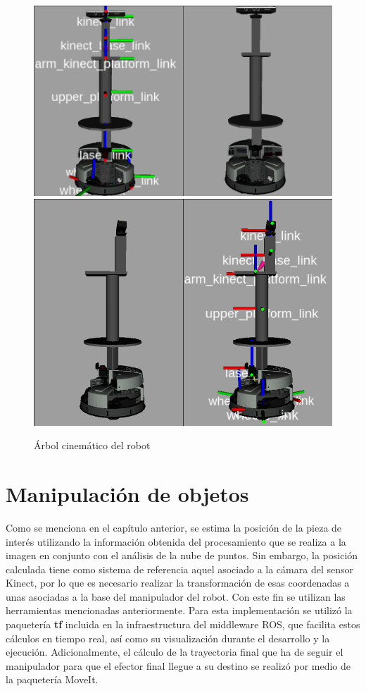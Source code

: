 \begin{figure}[ht]
    \centering
    \includegraphics[scale=0.3]{Figures/Robotino_model_front.png}
    \includegraphics[scale=0.3]{Figures/Robotino_model_side.png} 
        \caption{Árbol cinemático del robot}
        \label{fig:Robotino_models}
\end{figure}

\section{Manipulación de objetos}

Como se menciona en el capítulo anterior, se estima la posición de la pieza de interés utilizando la información obtenida del procesamiento que se realiza a la imagen en conjunto con el análisis de la nube de puntos. Sin embargo, la posición calculada tiene como sistema de referencia aquel asociado a la cámara del sensor Kinect, por lo que es necesario realizar la transformación de esas coordenadas a unas asociadas a la base del manipulador del robot. Con este fin se utilizan las herramientas mencionadas anteriormente. Para esta implementación se utilizó la paquetería \textbf{tf}\cite{tf_ROS} incluida en la infraestructura del middleware ROS, que facilita estos cálculos en tiempo real, así como su visualización durante el desarrollo y la ejecución. Adicionalmente, el cálculo de la trayectoria final que ha de seguir el manipulador para que el efector final llegue a su destino se realizó por medio de la paquetería MoveIt.

